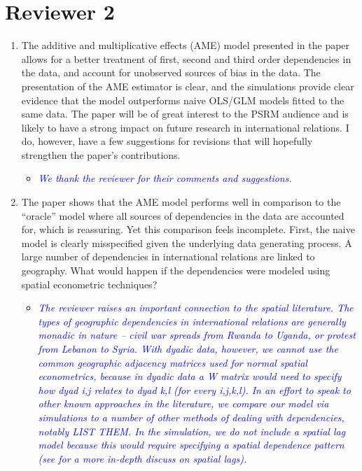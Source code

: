 \section*{Reviewer 2}

\begin{enumerate}
	\item The additive and multiplicative effects (AME) model presented in the paper allows for a better treatment of first, second and third order dependencies in the data, and account for unobserved sources of bias in the data. The presentation of the AME estimator is clear, and the simulations provide clear evidence that the model outperforms naive OLS/GLM models fitted to the same data. The paper will be of great interest to the PSRM audience and is likely to have a strong impact on future research in international relations. I do, however, have a few suggestions for revisions that will hopefully strengthen the paper’s contributions.
	\begin{itemize}
		\item \textcolor{blue}{ \emph{
		We thank the reviewer for their comments and suggestions.
		}}
	\end{itemize}
	\item The paper shows that the AME model performs well in comparison to the “oracle” model where all sources of dependencies in the data are accounted for, which is reassuring. Yet this comparison feels incomplete. First, the naive model is clearly misspecified given the underlying data generating process. A large number of dependencies in international relations are linked to geography. What would happen if the dependencies were modeled using spatial econometric techniques?
	\begin{itemize}
\item \textcolor{blue}{ \emph{
The reviewer raises an important connection to the spatial literature. The types of geographic dependencies in international relations are generally monadic in nature -- civil war spreads from Rwanda to Uganda, or protest from Lebanon to Syria. With dyadic data, however, we cannot use the common geographic adjacency matrices used for normal spatial econometrics, because in dyadic data a W matrix would need to specify how dyad i,j relates to dyad k,l (for every i,j,k,l). In an effort to speak to other known approaches in the literature, we compare our model via simulations to a number of other methods of dealing with dependencies, notably LIST THEM. In the simulation, we do not include a spatial lag model because this would require specifying a spatial dependence pattern (see \citet{plumper:neumayer:2010} for a more in-depth discuss on spatial lags). 
}}


\end{itemize}
\end{enumerate}
